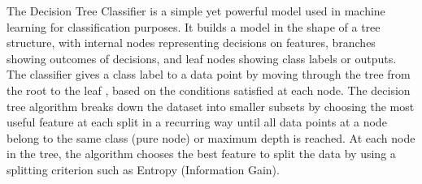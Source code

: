 \documentclass[12pt, a4paper,oneside]{book}
\numberwithin{equation}{section}
\begin{document}
The Decision Tree Classifier is a simple yet powerful model used in machine learning for classification purposes. It builds a model in the shape of a tree structure,  with internal nodes representing decisions on features, branches showing outcomes of decisions, and leaf nodes showing class labels or outputs. The classifier gives a class label to a data point by moving through the tree from the root to the leaf \cite{rokach2005}, based on the conditions satisfied at each node. The decision tree algorithm breaks down the dataset into smaller subsets by choosing the most useful feature \cite{krishnan2021} at each split in a recurring way until all data points at a node belong to the same class (pure node) or maximum depth is reached. At each node in the tree, the algorithm chooses the best feature to split the data by using a splitting criterion such as Entropy (Information Gain).
\end{document}
